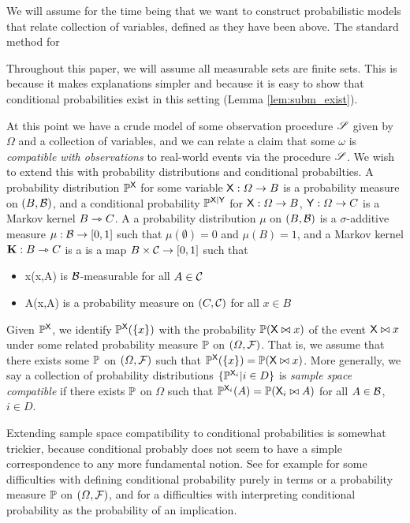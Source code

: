 We will assume for the time being that we want to construct probabilistic models that relate collection of variables, defined as they have been above. The standard method for 

Throughout this paper, we will assume all measurable sets are finite sets. This is because it makes explanations simpler and because it is easy to show that conditional probabilities exist in this setting (Lemma \ref{lem:subm_exist}).

At this point we have a crude model of some observation procedure $\mathscr{S}$ given by $\Omega$ and a collection of variables, and we can relate a claim that some $\omega$ is \emph{compatible with observations} to real-world events via the procedure $\mathscr{S}$. We wish to extend this with probability distributions and conditional probabilties. A probability distribution $\mathbb{P}^{\mathsf{X}}$ for some variable $\mathsf{X}:\Omega\to B$ is a probability measure on $(B,\mathcal{B})$, and a conditional probability $\mathbb{P}^{\mathsf{X}|\mathsf{Y}}$ for $\mathsf{X}:\Omega\to B$, $\mathsf{Y}:\Omega\to C$ is a Markov kernel $B\rightarrowtriangle C$. A a probability distribution $\mu$ on $(B,\mathcal{B})$ is a $\sigma$-additive measure $\mu:\mathcal{B}\to [0,1]$ such that $\mu(\emptyset)=0$ and $\mu(B)=1$, and a Markov kernel $\mathbf{K}:B\rightarrowtriangle C$ is a is a map $B\times \mathcal{C}\to [0,1]$ such that

\begin{itemize}
	\item x\mapsto {}(x,A) is $\mathcal{B}$-measurable for all $A\in \mathcal{C}$
	\item A\mapsto {}(x,A) is a probability measure on $(C,\mathcal{C})$ for all $x\in B$
\end{itemize}

Given $\mathbb{P}^{\mathsf{X}}$, we identify $\mathbb{P}^{\mathsf{X}}(\{x\})$ with the probability $\mathbb{P}(\mathsf{X}\bowtie x)$ of the event $\mathsf{X}\bowtie x$ under some related probability measure $\mathbb{P}$ on $(\Omega,\mathcal{F})$. That is, we assume that there exists some $\mathbb{P}$ on $(\Omega,\mathcal{F})$ such that $\mathbb{P}^{\mathsf{X}}(\{x\})=\mathbb{P}(\mathsf{X}\bowtie x)$. More generally, we say a collection of probability distributions $\{\mathbb{P}^{\mathsf{X}_i}|i\in D\}$ is \emph{sample space compatible} if there exists $\mathbb{P}$ on $\Omega$ such that $\mathbb{P}^{\mathsf{X}_i}(A)=\mathbb{P}(\mathsf{X}_i\bowtie A)$ for all $A\in \mathcal{B}$, $i\in D$.

Extending sample space compatibility to conditional probabilities is somewhat trickier, because conditional probably does not seem to have a simple correspondence to any more fundamental notion. See for example \citet{hajek_what_2003} for some difficulties with defining conditional probability purely in terms or a probability measure $\mathbb{P}$ on $(\Omega,\mathcal{F})$, and \citet{nguyen_probability_2002} for a difficulties with interpreting conditional probability as the probability of an implication.

